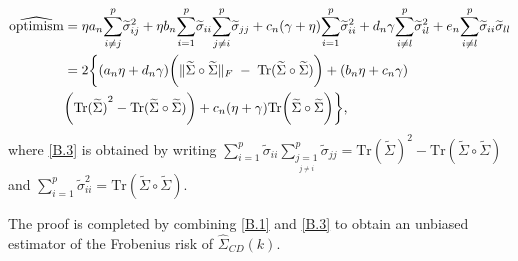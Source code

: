 \documentclass[11pt,oneside]{amsart}
\begin{document}
\begin{align} \label{B.3}
{\widehat{\text{optimism}}} & = {\eta}a_n{\displaystyle\sum\limits_{i\ne j}^{p}}{\widetilde{\sigma}}_{ij}^{2} + {\eta}b_n{\displaystyle\sum\limits_{i=1}^{p}}{\widetilde{\sigma}}_{ii}{\displaystyle\sum\limits_{j \ne i}^{p}}{\widetilde{\sigma}}_{jj} + c_n(\gamma + \eta){\displaystyle\sum\limits_{i = 1}^{p}}{\widetilde{\sigma}}_{ii}^{2} + d_n{\gamma}{\displaystyle\sum\limits_{i \ne l}^{p}}{\widetilde{\sigma}}_{il}^{2} + e_n{\displaystyle\sum\limits_{i \ne l}^{p}}{\widetilde{\sigma}}_{ii}{\widetilde{\sigma}}_{ll} \notag \\
& = 2\bigg\{(a_n\eta + d_n\gamma)\bigg(\|{\widetilde{\Sigma}}\circ{\widetilde{\Sigma}}\|_{F} \;- \;\mbox{Tr}({\widetilde{\Sigma}}\circ{\widetilde{\Sigma}})\bigg) +  (b_n\eta +  c_n\gamma) \notag \\
& \bigg({{\mbox{Tr}}({\widetilde{\Sigma}})}^{2} - {\mbox{Tr}}({\widetilde{\Sigma}} \circ {\widetilde{\Sigma}})\bigg) + c_n(\eta + \gamma){\mbox{Tr}}\bigg({\widetilde{\Sigma}} \circ {\widetilde{\Sigma}}\bigg)\bigg\},
\end{align}
where \eqref{B.3} is obtained by writing ${\displaystyle\sum\limits_{i=1}^{p}}{\widetilde{\sigma}}_{ii}{\displaystyle\sum\limits_{\underset{j \ne i}{j = 1}}^{p}}{\widetilde{\sigma}}_{jj} = {{\mbox{Tr}}({\widetilde{\Sigma}})}^{2} - {\mbox{Tr}}({\widetilde{\Sigma}} \circ {\widetilde{\Sigma}})$ and ${\displaystyle\sum\limits_{i=1}^{p}}{\widetilde{\sigma}}_{ii}^{2} = {\mbox{Tr}}({\widetilde{\Sigma}} \circ {\widetilde{\Sigma}})$.

The proof is completed by combining \eqref{B.1} and \eqref{B.3} to obtain an unbiased estimator of the Frobenius risk of ${\widehat{\Sigma}}_{CD}(k)$. 
\end{document}
